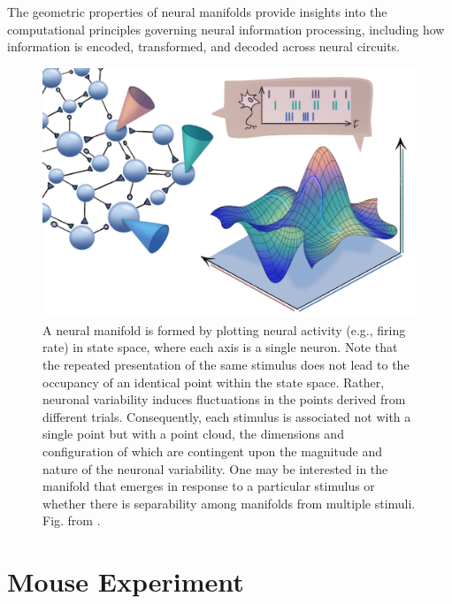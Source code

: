 \documentclass[11pt,a4paper]{article}
\begin{document}
The geometric properties of neural manifolds provide insights into the computational principles governing neural information processing, including how information is encoded, transformed, and decoded across neural circuits.

\begin{figure}
    \centering
    \includegraphics[width=0.75\linewidth]{figs/manifold_schematic.png}
    \caption{A neural manifold is formed by plotting neural activity (e.g., firing rate) in state space, where each axis is a single neuron. Note that the repeated presentation of the same stimulus does not lead to the occupancy of an identical point within the state space. Rather, neuronal variability induces fluctuations in the points derived from different trials. Consequently, each stimulus is associated not with a single point but with a point cloud, the dimensions and configuration of which are contingent upon the magnitude and nature of the neuronal variability. One may be interested in the manifold that emerges in response to a particular stimulus or whether there is separability among manifolds from multiple stimuli. Fig. from \cite{Perich2024}.}
    \label{fig:manifolds}
\end{figure}


\section{Mouse Experiment}
\end{document}
